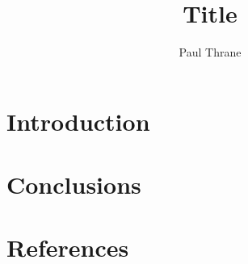 \documentclass[5p]{elsarticle}        	%
\begin{document}
\begin{frontmatter}
\title{Title}
\author{Paul Thrane}
\begin{abstract}

\end{abstract}
\end{frontmatter}
\section{Introduction}


\section{Conclusions}

\nocite{*}

\section*{References}

  
\end{document}
